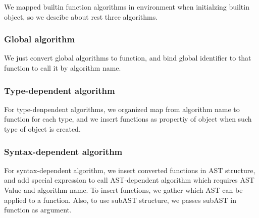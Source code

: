 We mapped builtin function algorithms in environment when initialzing builtin object, so we descibe about rest three algorithms. 

\subsubsection{Global algorithm}

We just convert global algorithms to function, and bind global identifier to that function to call it by algorithm name.

\subsubsection{Type-dependent algorithm}

For type-denpendent algorithms, we organized map from algorithm name to function for each type,
 and we insert functions as propertiy of object when such type of object is created.

 \subsubsection{Syntax-dependent algorithm}
For syntax-dependent algorithm, we insert converted functions in AST structure, and add special expression to call AST-dependent algorithm which requires AST Value and algorithm name.
To insert functions, we gather which AST can be applied to a function. Also, to use subAST structure, we passes subAST in function as argument.


